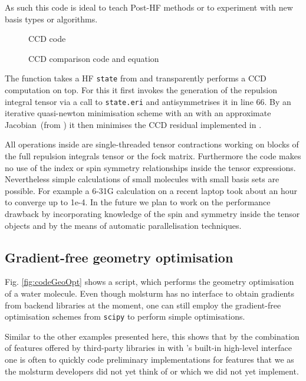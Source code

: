 As such this code is ideal to teach Post-HF methods
or to experiment with new basis types or algorithms.

\begin{figure}
	
	\caption{CCD code}
	\label{fig:codeCCD}
\end{figure}

\begin{figure}
	
	\caption{CCD comparison code and equation}
	\label{fig:comparisonCCD}
\end{figure}


The  function takes a HF \texttt{state} from \molsturm and transparently
performs a CCD computation on top.
For this it first invokes the generation of the repulsion integral tensor
via a call to \texttt{state.eri} and antisymmetrises it in line 66.
By an iterative quasi-newton minimisation scheme with an
with an approximate Jacobian~(from )
it then minimises the CCD residual implemented in .

All operations inside  are single-threaded tensor contractions
working on blocks of the full repulsion integrals tensor or the fock matrix.
Furthermore the code makes no use of the index or spin symmetry relationships
inside the tensor expressions.
Nevertheless simple calculations of small molecules with small basis sets are possible.
For example a  6-31G calculation on a recent laptop took
about an hour to converge up to 1e-4.
In the future we plan to work on the performance drawback by incorporating
knowledge of the spin and symmetry inside the tensor objects
and by the means of automatic parallelisation techniques.

\subsection{Gradient-free geometry optimisation}
\label{sec:ex:geo}
Fig. \ref{fig:codeGeoOpt} shows a \python script,
which performs the geometry optimisation of a water molecule.
Even though molsturm has no interface to obtain gradients
from backend libraries at the moment,
one can still employ the gradient-free optimisation schemes from \texttt{scipy}
to perform simple optimisations.

Similar to the other examples presented here,
this shows that by the combination of features offered by third-party
libraries in \python with \molsturm's built-in high-level interface
one is often to quickly code preliminary implementations
for features that we as the molsturm developers did not yet think of
or which we did not yet implement.

